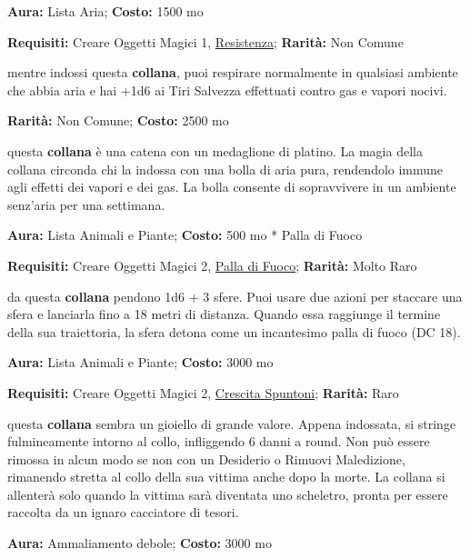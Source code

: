 \begin{multicols}{2}

\textbf{Aura:} Lista Aria; \textbf{Costo:} 1500 mo

\textbf{Requisiti:} Creare Oggetti Magici 1, \hyperlink{ResistenzaalVeleno}{Resistenza}; \textbf{Rarità:} Non Comune

mentre indossi questa \textbf{collana}, puoi respirare normalmente in qualsiasi ambiente che abbia aria e hai +1d6 ai Tiri Salvezza effettuati contro gas e vapori nocivi.


\textbf{Rarità:} Non Comune; \textbf{Costo:} 2500 mo

questa \textbf{collana} è una catena con un medaglione di platino. La magia della collana circonda chi la indossa con una bolla di aria pura, rendendolo immune agli effetti dei vapori e dei gas. La bolla consente di sopravvivere in un ambiente senz'aria per una settimana.


\textbf{Aura:} Lista Animali e Piante; \textbf{Costo:} 500 mo * Palla di Fuoco

\textbf{Requisiti:} Creare Oggetti Magici 2, \hyperlink{Palla di Fuoco}{Palla di Fuoco}; \textbf{Rarità:} Molto Raro

da questa \textbf{collana} pendono 1d6 + 3 sfere. Puoi usare due azioni per staccare una sfera e lanciarla fino a 18 metri di distanza. Quando essa raggiunge il termine della sua traiettoria, la sfera detona come un incantesimo palla di fuoco (DC 18).


\textbf{Aura:} Lista Animali e Piante; \textbf{Costo:} 3000 mo

\textbf{Requisiti:} Creare Oggetti Magici 2, \hyperlink{Crescita Spuntoni}{Crescita Spuntoni}; \textbf{Rarità:} Raro

questa \textbf{collana} sembra un gioiello di grande valore. Appena indossata, si stringe fulmineamente intorno al collo, infliggendo 6 danni a round. Non può essere rimossa in alcun modo se non con un Desiderio o Rimuovi Maledizione, rimanendo stretta al collo della sua vittima anche dopo la morte. La collana si allenterà solo quando la vittima sarà diventata uno scheletro, pronta per essere raccolta da un ignaro cacciatore di tesori.


\textbf{Aura:} Ammaliamento debole; \textbf{Costo:} 3000 mo


\end{multicols}

